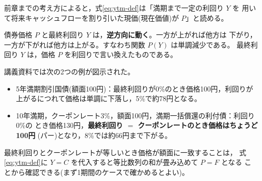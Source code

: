 前章までの考え方によると，式\eqref{eq:ytm-def}は「満期まで一定の利回り $Y$ を
用いて将来キャッシュフローを割り引いた現価(現在価値)が $P$」と読める。

\begin{keypoint}[債券価格と最終利回りの関係]
債券価格 $P$ と最終利回り $Y$ は，\textbf{逆方向に動く}。一方が上がれば他方は
下がり，一方が下がれば他方は上がる。すなわち関数 $P(Y)$ は単調減少である。
最終利回り $Y$ は，価格 $P$ を利回りで言い換えたものである。
\end{keypoint}

講義資料では次の2つの例が図示された。
\begin{itemize}
\item 5年満期割引国債(額面100円)：最終利回りが0\%のとき価格100円，利回りが
上がるにつれて価格は単調に下落し，5\%で約78円となる。
\item 10年満期，クーポンレート3\%，額面100円，満期一括償還の利付債：利回り0\%の
とき価格130円，\textbf{最終利回り $=$ クーポンレートのとき価格はちょうど100円}
(パー)となり，8\%では約66円まで下がる。
\end{itemize}
最終利回りとクーポンレートが等しいとき価格が額面に一致することは，
式\eqref{eq:ytm-def}に $Y=C$ を代入すると等比数列の和が畳み込めて $P=F$ となる
ことから確認できる(まず1期間のケースで確かめるとよい)。

